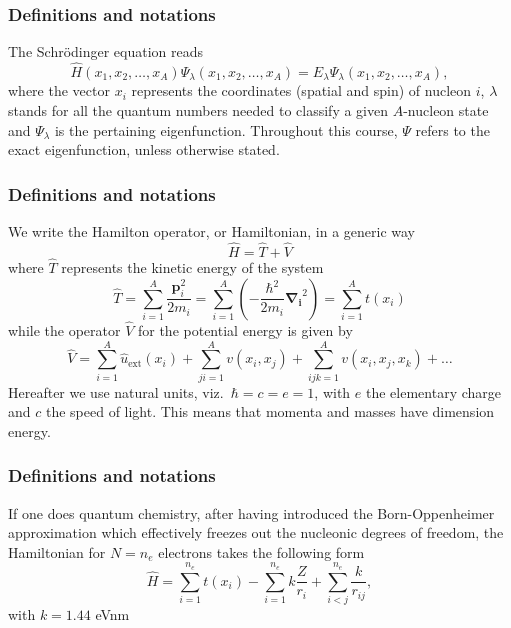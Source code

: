\documentclass[compress]{beamer}
\begin{document}
\frame
{
  \frametitle{Definitions and notations}
\begin{small}
{\scriptsize
The Schr\"odinger equation reads 
\begin{equation}
\hat{H}(x_1, x_2, \dots , x_A) \Psi_{\lambda}(x_1, x_2, \dots , x_A) = 
E_\lambda  \Psi_\lambda(x_1, x_2, \dots , x_A), 
\label{eq:basicSE1}
\end{equation}
where the vector $x_i$ represents the coordinates (spatial and spin) of nucleon $i$, $\lambda$ stands  for all the quantum
numbers needed to classify a given $A$-nucleon state and $\Psi_{\lambda}$ is the pertaining eigenfunction.  Throughout this course,
$\Psi$ refers to the exact eigenfunction, unless otherwise stated.
}
\end{small}
}

\frame
{
  \frametitle{Definitions and notations}
\begin{small}
{\scriptsize
We write the Hamilton operator, or Hamiltonian,  in a generic way 
\[
	\hat{H} = \hat{T} + \hat{V} 
\]
where $\hat{T}$  represents the kinetic energy of the system
\[
	\hat{T} = \sum_{i=1}^A \frac{\mathbf{p}_i^2}{2m_i} = \sum_{i=1}^A \left( -\frac{\hbar^2}{2m_i} \mathbf{\nabla_i}^2 \right) =
		\sum_{i=1}^A t(x_i)
\]
while the operator $\hat{V}$ for the potential energy is given by
\begin{equation}
	\hat{V} = \sum_{i=1}^A \hat{u}_{\mathrm{ext}}(x_i) + \sum_{ji=1}^A v(x_i,x_j)+\sum_{ijk=1}^Av(x_i,x_j,x_k)+\dots
\label{eq:firstv}
\end{equation}
Hereafter we use natural units, viz.~$\hbar=c=e=1$, with $e$ the elementary charge and $c$ the speed of light. This means that momenta and masses
have dimension energy. 
}
\end{small}
}
\frame
{
  \frametitle{Definitions and notations}
\begin{small}
{\scriptsize
If one does quantum chemistry, after having introduced the  Born-Oppenheimer approximation which effectively freezes out the nucleonic degrees
of freedom, the Hamiltonian for $N=n_e$ electrons takes the following form 
\[
  \hat{H} = \sum_{i=1}^{n_e} t(x_i) 
  - \sum_{i=1}^{n_e} k\frac{Z}{r_i} + \sum_{i<j}^{n_e} \frac{k}{r_{ij}},
\]
with $k=1.44$ eVnm
}
\end{small}
}
\end{document}
